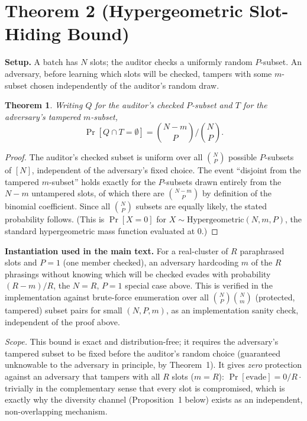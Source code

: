 \documentclass[10pt,journal,compsoc]{IEEEtran}
\newtheorem{theorem}{Theorem}
\begin{document}
\section*{Theorem 2 (Hypergeometric Slot-Hiding Bound)}

\textbf{Setup.} A batch has $N$ slots; the auditor checks a uniformly random $P$-subset. An adversary, before learning which slots will be checked, tampers with some $m$-subset chosen independently of the auditor's random draw.

\begin{theorem}
Writing $Q$ for the auditor's checked $P$-subset and $T$ for the adversary's tampered $m$-subset,
\[
\Pr[Q \cap T = \emptyset] = \binom{N-m}{P}\Big/\binom{N}{P}.
\]
\end{theorem}

\begin{proof}
The auditor's checked subset is uniform over all $\binom{N}{P}$ possible $P$-subsets of $[N]$, independent of the adversary's fixed choice. The event ``disjoint from the tampered $m$-subset'' holds exactly for the $P$-subsets drawn entirely from the $N-m$ untampered slots, of which there are $\binom{N-m}{P}$ by definition of the binomial coefficient. Since all $\binom{N}{P}$ subsets are equally likely, the stated probability follows. (This is $\Pr[X=0]$ for $X \sim \mathrm{Hypergeometric}(N,m,P)$, the standard hypergeometric mass function evaluated at $0$.)
\end{proof}

\noindent \textbf{Instantiation used in the main text.} For a real-cluster of $R$ paraphrased slots and $P=1$ (one member checked), an adversary hardcoding $m$ of the $R$ phrasings without knowing which will be checked evades with probability $(R-m)/R$, the $N{=}R,\,P{=}1$ special case above. This is verified in the implementation against brute-force enumeration over all $\binom{N}{P}\binom{N}{m}$ (protected, tampered) subset pairs for small $(N,P,m)$, as an implementation sanity check, independent of the proof above.

\noindent \emph{Scope.} This bound is exact and distribution-free; it requires the adversary's tampered subset to be fixed before the auditor's random choice (guaranteed unknowable to the adversary in principle, by Theorem~1). It gives \emph{zero} protection against an adversary that tampers with all $R$ slots ($m=R$): $\Pr[\text{evade}]=0/R\cdot$ trivially in the complementary sense that every slot is compromised, which is exactly why the diversity channel (Proposition~1 below) exists as an independent, non-overlapping mechanism.
\end{document}
